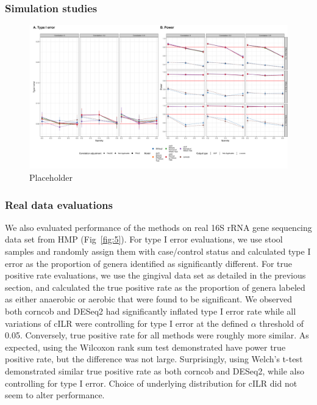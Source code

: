 \documentclass[10pt,letterpaper]{article}
\begin{document}
\subsubsection*{Simulation studies}
\begin{figure}[!ht]
    \centering
    \includegraphics[width = \textwidth]{figures/sim_diff_ab_comb.png}
    \caption{Placeholder} 
    \label{fig:4}
\end{figure}
\subsubsection*{Real data evaluations}
We also evaluated performance of the methods on real 16S rRNA gene sequencing data set from HMP (Fig~\ref{fig:5}). For type I error evaluations, we use stool samples and randomly assign them with case/control status and calculated type I error as the proportion of genera identified as significantly different. For true positive rate evaluations, we use the gingival data set as detailed in the previous section, and calculated the true positive rate as the proportion of genera labeled as either anaerobic or aerobic that were found to be significant.   
We observed both corncob and DESeq2 had significantly inflated type I error rate while all variations of cILR were controlling for type I error at the defined $\alpha$ threshold of 0.05. Conversely, true positive rate for all methods were roughly more similar. As expected, using the Wilcoxon rank sum test demonstrated have power true positive rate, but the difference was not large. Surprisingly, using Welch's t-test demonstrated similar true positive rate as both corncob and DESeq2, while also controlling for type I error. Choice of underlying distribution for cILR did not seem to alter performance. 
\end{document}
